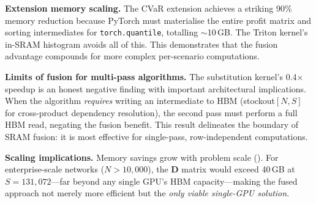 \textbf{Extension memory scaling.} The CVaR extension achieves a striking 90\% memory reduction because PyTorch must materialise the entire profit matrix and sorting intermediates for \texttt{torch.quantile}, totalling $\sim$10\,GB. The Triton kernel's in-SRAM histogram avoids all of this. This demonstrates that the fusion advantage compounds for more complex per-scenario computations.

\textbf{Limits of fusion for multi-pass algorithms.} The substitution kernel's 0.4$\times$ speedup is an honest negative finding with important architectural implications. When the algorithm \emph{requires} writing an intermediate to HBM (stockout$[N,S]$ for cross-product dependency resolution), the second pass must perform a full HBM read, negating the fusion benefit. This result delineates the boundary of SRAM fusion: it is most effective for single-pass, row-independent computations.

\textbf{Scaling implications.} Memory savings grow with problem scale (). For enterprise-scale networks ($N > 10{,}000$), the $\mathbf{D}$ matrix would exceed 40\,GB at $S{=}131{,}072$---far beyond any single GPU's HBM capacity---making the fused approach not merely more efficient but the \emph{only viable single-GPU solution}.
